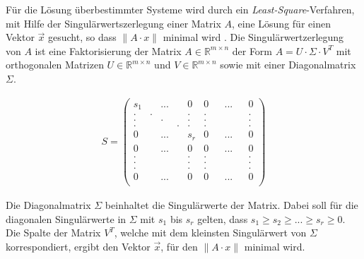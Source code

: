 Für die Lösung überbestimmter Systeme wird durch ein \textit{Least-Square}-Verfahren, mit Hilfe der Singulärwertszerlegung einer Matrix $A$, eine Lösung für einen Vektor $\vec{x}$ gesucht, so dass $\parallel A \cdot x \parallel$ minimal wird \cite{HZ,Scholz,Schwarz}. Die Singulärwertzerlegung von $A$ ist eine Faktorisierung der Matrix \ensuremath{A \in \mathbb{R}^{m \times n}} der Form \ensuremath{A = U \cdot \Sigma \cdot V^T} mit orthogonalen Matrizen \ensuremath{U \in \mathbb{R}^{m \times n}} und \ensuremath{V \in \mathbb{R}^{m \times n}} sowie mit einer Diagonalmatrix $\Sigma$. 


\begin{gather}
	S = \begin{pmatrix}
		s_1&&...&&0&0&&...&&0\\
		.&.&&&.&.&&&&.\\
		.&&.&&.&.&&&&.\\
		.&&&.&.&.&&&&.\\
		0&&...&&s_r&0&&...&&0\\	
		0&&...&&0&0&&...&&0\\
		.&&&&.&.&&&&.\\
		.&&&&.&.&&&&.\\	
		.&&&&.&.&&&&.\\	
		0&&...&&0&0&&...&&0\\	
	\end{pmatrix}
\end{gather}

Die  Diagonalmatrix $\Sigma$ beinhaltet die Singulärwerte der Matrix. Dabei soll für die diagonalen Singulärwerte in $\Sigma$ mit $s_1$ bis $s_r$ gelten, dass \ensuremath{s_1 \geq s_2 \geq ... \geq s_r \ge 0 }\cite{Scholz}. Die Spalte der Matrix $V^T$, welche mit dem kleinsten Singulärwert von $\Sigma$ korrespondiert, ergibt den Vektor $\vec{x}$, für den \ensuremath{\parallel A \cdot x\parallel} minimal wird. \\





